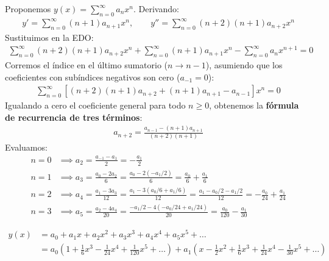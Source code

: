 \documentclass[11pt, a4paper]{article}
\begin{document}
Proponemos $y(x) = \sum_{n=0}^{\infty} a_n x^n$. Derivando:
\begin{align*}
y' = \sum_{n=0}^{\infty} (n+1)a_{n+1} x^n, \qquad y'' = \sum_{n=0}^{\infty} (n+2)(n+1)a_{n+2} x^n
\end{align*}
Sustituimos en la EDO:
\begin{align*}
\sum_{n=0}^{\infty} (n+2)(n+1)a_{n+2} x^n + \sum_{n=0}^{\infty} (n+1)a_{n+1} x^n - \sum_{n=0}^{\infty} a_n x^{n+1} = 0
\end{align*}
Corremos el índice en el último sumatorio ($n \to n-1$), asumiendo que los coeficientes con subíndices negativos son cero ($a_{-1} = 0$):
\begin{align*}
\sum_{n=0}^{\infty} \left[ (n+2)(n+1)a_{n+2} + (n+1)a_{n+1} - a_{n-1} \right] x^n = 0
\end{align*}
Igualando a cero el coeficiente general para todo $n \geq 0$, obtenemos la \textbf{fórmula de recurrencia de tres términos}:
\begin{align*}
a_{n+2} = \frac{a_{n-1} - (n+1)a_{n+1}}{(n+2)(n+1)}
\end{align*}
Evaluamos:
\begin{align*}
n=0 &\implies a_2 = \frac{a_{-1} - a_1}{2} = -\frac{a_1}{2} \\
n=1 &\implies a_3 = \frac{a_0 - 2a_2}{6} = \frac{a_0 - 2(-a_1/2)}{6} = \frac{a_0}{6} + \frac{a_1}{6} \\
n=2 &\implies a_4 = \frac{a_1 - 3a_3}{12} = \frac{a_1 - 3(a_0/6 + a_1/6)}{12} = \frac{a_1 - a_0/2 - a_1/2}{12} = -\frac{a_0}{24} + \frac{a_1}{24} \\
n=3 &\implies a_5 = \frac{a_2 - 4a_4}{20} = \frac{-a_1/2 - 4(-a_0/24 + a_1/24)}{20} = \frac{a_0}{120} - \frac{a_1}{30}
\end{align*}

\begin{align*}
y(x) &= a_0 + a_1 x + a_2 x^2 + a_3 x^3 + a_4 x^4 + a_5 x^5 + \dots \\
&= a_0\left(1 + \frac{1}{6}x^3 - \frac{1}{24}x^4 + \frac{1}{120}x^5 + \dots\right) + a_1\left(x - \frac{1}{2}x^2 + \frac{1}{6}x^3 + \frac{1}{24}x^4 - \frac{1}{30}x^5 + \dots\right)
\end{align*}
\end{document}
